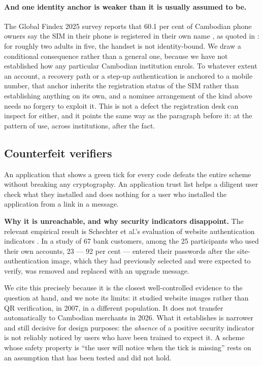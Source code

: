 \documentclass[10pt,a4paper,twocolumn]{article}
\begin{document}
\paragraph{And one identity anchor is weaker than it is usually assumed to be.}
The Global Findex 2025 survey reports that 60.1 per cent of Cambodian phone
owners say the SIM in their phone is registered in their own name
\citep{findex2025}, as quoted in \citet{chay2026stages}: for roughly two adults
in five, the handset is not
identity-bound. We draw a conditional consequence rather than a general one,
because we have not established how any particular Cambodian institution
enrols. To whatever extent an account, a recovery path or a step-up
authentication is anchored to a mobile number, that anchor inherits the
registration status of the SIM rather than establishing anything on its own, and
a nominee arrangement of the kind above needs no forgery to exploit it. This is
not a defect the registration desk can inspect for either, and it points the
same way as the paragraph before it: at the pattern of use, across institutions,
after the fact.

\subsection{Counterfeit verifiers}
\label{sec:counterfeit}
\label{sec:indicators}

An application that shows a green tick for every code defeats the entire scheme
without breaking any cryptography. An application trust list helps a diligent
user check what they installed and does nothing for a user who installed the
application from a link in a message.

\textbf{Why it is unreachable, and why security indicators disappoint.} The
relevant empirical result is Schechter et al.'s evaluation of website
authentication indicators \citep{schechter2007emperor}. In a study of 67 bank
customers, among the 25 participants who used their own accounts, 23 --- 92 per
cent --- entered their passwords after the site-authentication image, which they
had previously selected and were expected to verify, was removed and replaced
with an upgrade message.

We cite this precisely because it is the closest well-controlled evidence to the
question at hand, and we note its limits: it studied website images rather than
QR verification, in 2007, in a different population. It does not transfer
automatically to Cambodian merchants in 2026. What it establishes is narrower
and still decisive for design purposes: the \emph{absence} of a positive
security indicator is not reliably noticed by users who have been trained to
expect it. A scheme whose safety property is ``the user will notice when the
tick is missing'' rests on an assumption that has been tested and did not hold.
\end{document}
